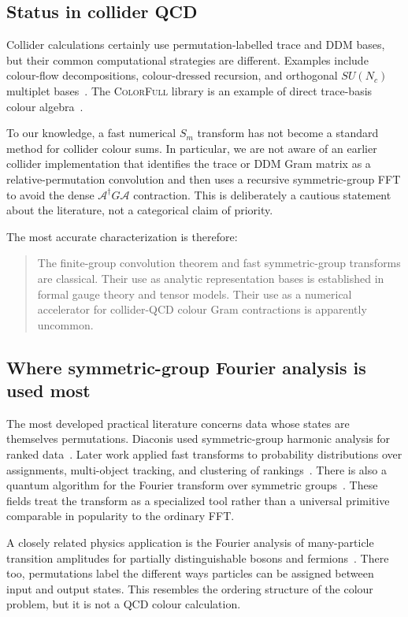 \documentclass[11pt,a4paper]{article}
\newcommand{\cA}{\mathcal{A}}
\begin{document}
\subsection{Status in collider QCD}

Collider calculations certainly use permutation-labelled trace and DDM
bases, but their common computational strategies are different.  Examples
include colour-flow decompositions, colour-dressed recursion, and orthogonal
$SU(N_c)$ multiplet bases~\cite{Maltoni:2002mq,Duhr:2006iq,Keppeler:2012ih}.  The
\textsc{ColorFull} library is an example of direct trace-basis colour
algebra~\cite{Sjodahl:2014opa}.

To our knowledge, a fast numerical $S_m$ transform has not become a standard
method for collider colour sums.  In particular, we are not aware of an
earlier collider implementation that identifies the trace or DDM Gram matrix
as a relative-permutation convolution and then uses a recursive
symmetric-group FFT to avoid the dense $\cA^\dagger G\cA$ contraction.  This
is deliberately a cautious statement about the literature, not a categorical
claim of priority.

The most accurate characterization is therefore:
\begin{quote}
The finite-group convolution theorem and fast symmetric-group transforms are
classical.  Their use as analytic representation bases is established in
formal gauge theory and tensor models.  Their use as a numerical accelerator
for collider-QCD colour Gram contractions is apparently uncommon.
\end{quote}

\subsection{Where symmetric-group Fourier analysis is used most}

The most developed practical literature concerns data whose states are
themselves permutations.  Diaconis used symmetric-group harmonic analysis
for ranked data~\cite{diaconis1989}.  Later work applied fast transforms to
probability distributions over assignments, multi-object tracking, and
clustering of rankings~\cite{kondor2007,plumb2015}.  There is also a quantum
algorithm for the Fourier transform over symmetric groups~\cite{beals1997}.
These fields treat the transform as a specialized tool rather than a
universal primitive comparable in popularity to the ordinary FFT.

A closely related physics application is the Fourier analysis of
many-particle transition amplitudes for partially distinguishable bosons and
fermions~\cite{Dufour:2024nmz}.  There too, permutations label the different ways
particles can be assigned between input and output states.  This resembles
the ordering structure of the colour problem, but it is not a QCD colour
calculation.
\end{document}
